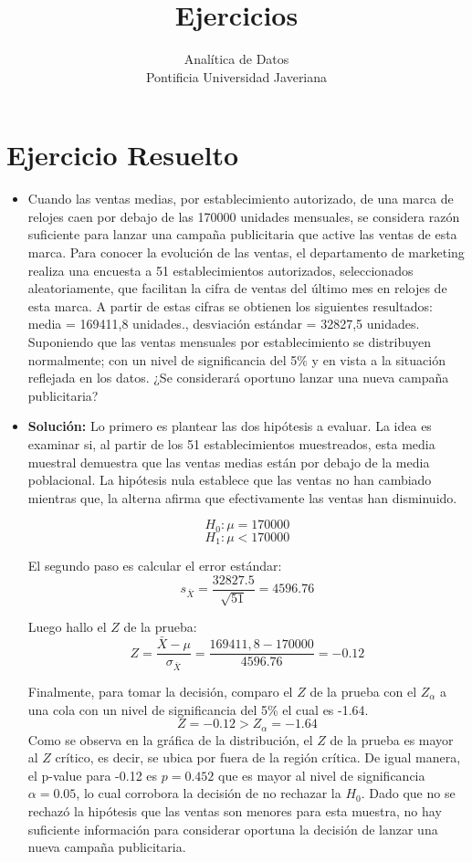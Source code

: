 \documentclass[letterpaper]{article}
\title{{\bf Ejercicios}}
\author{Analítica de Datos  \\
	Pontificia Universidad Javeriana}
\date{}
\begin{document}
\maketitle

\section{Ejercicio Resuelto}
\begin{itemize}
    \item Cuando las ventas medias, por establecimiento autorizado, de una marca de relojes caen por debajo de las 170000 unidades mensuales, se considera razón suficiente para lanzar una campaña publicitaria que active las ventas de esta marca. Para conocer la evolución de las ventas, el departamento de marketing realiza una encuesta a 51 establecimientos autorizados, seleccionados aleatoriamente, que facilitan la cifra de ventas del último mes en relojes de esta marca. A partir de estas cifras se obtienen los siguientes resultados: media = 169411,8 unidades., desviación estándar = 32827,5 unidades. Suponiendo que las ventas mensuales por establecimiento se distribuyen normalmente; con un nivel de significancia del 5\% y en vista a la situación reflejada en los datos. ¿Se considerará oportuno lanzar una nueva campaña publicitaria?
    \item {\bf Solución:} Lo primero es plantear las dos hipótesis a evaluar. La idea es examinar si, al partir de los 51 establecimientos muestreados, esta media muestral demuestra que las ventas medias están por debajo de la media poblacional. La hipótesis nula establece que las ventas no han cambiado mientras que, la alterna afirma que efectivamente las ventas han disminuido.
    
    $$H_0: \mu = 170000$$ 
    $$H_1: \mu < 170000$$
    
    El segundo paso es calcular el error estándar:
    $$s_{\bar{X}}=\dfrac{32827.5}{\sqrt{51}}=4596.76$$
    
    Luego hallo el $Z$ de la prueba:
    $$Z=\dfrac{\bar{X}-\mu}{\sigma_{\bar{X}}}=\dfrac{169411,8-170000}{4596.76}=-0.12$$
    
    Finalmente, para tomar la decisión, comparo el $Z$ de la prueba con el $Z_{\alpha}$ a una cola con un nivel de significancia del 5\% el cual es -1.64.
    $$Z=-0.12>Z_{\alpha}=-1.64$$
    Como se observa en la gráfica de la distribución, el $Z$ de la prueba es mayor al $Z$ crítico, es decir, se ubica por fuera de la región crítica. De igual manera, el p-value para -0.12 es $p=0.452$ que es mayor al nivel de significancia $\alpha=0.05$, lo cual corrobora la decisión de no rechazar la $H_0$. Dado que no se rechazó la hipótesis que las ventas son menores para esta muestra, no hay suficiente información para considerar oportuna la decisión de lanzar una nueva campaña publicitaria. 
    \begin{center}


\end{center}
\end{itemize}
\end{document}
